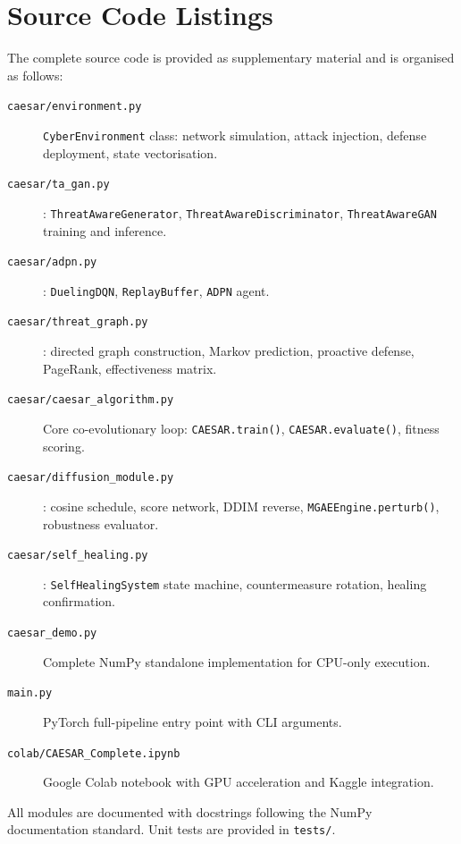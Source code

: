 \chapter{Source Code Listings}
\label{app:code}

The complete \caesar{} source code is provided as supplementary
material and is organised as follows:

\begin{description}
  \item[\texttt{caesar/environment.py}]
    \texttt{CyberEnvironment} class: network simulation, attack injection,
    defense deployment, state vectorisation.

  \item[\texttt{caesar/ta\_gan.py}]
    \tagan{}: \texttt{ThreatAwareGenerator}, \texttt{ThreatAwareDiscriminator},
    \texttt{ThreatAwareGAN} training and inference.

  \item[\texttt{caesar/adpn.py}]
    \adpn{}: \texttt{DuelingDQN}, \texttt{ReplayBuffer}, \texttt{ADPN} agent.

  \item[\texttt{caesar/threat\_graph.py}]
    \tagraph{}: directed graph construction, Markov prediction,
    proactive defense, PageRank, effectiveness matrix.

  \item[\texttt{caesar/caesar\_algorithm.py}]
    Core co-evolutionary loop: \texttt{CAESAR.train()},
    \texttt{CAESAR.evaluate()}, fitness scoring.

  \item[\texttt{caesar/diffusion\_module.py}]
    \mgae{}: cosine schedule, score network, DDIM reverse,
    \texttt{MGAEEngine.perturb()}, robustness evaluator.

  \item[\texttt{caesar/self\_healing.py}]
    \arl{}: \texttt{SelfHealingSystem} state machine,
    countermeasure rotation, healing confirmation.

  \item[\texttt{caesar\_demo.py}]
    Complete NumPy standalone implementation for CPU-only execution.

  \item[\texttt{main.py}]
    PyTorch full-pipeline entry point with CLI arguments.

  \item[\texttt{colab/CAESAR\_Complete.ipynb}]
    Google Colab notebook with GPU acceleration and Kaggle integration.
\end{description}

All modules are documented with docstrings following the NumPy
documentation standard. Unit tests are provided in \texttt{tests/}.
